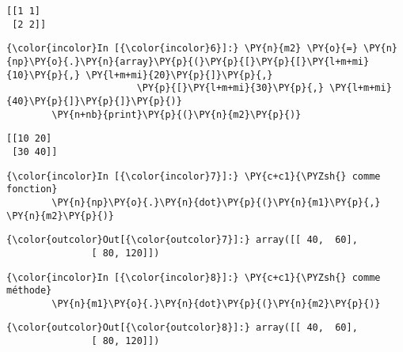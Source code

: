    \begin{Verbatim}[commandchars=\\\{\},frame=single,framerule=0.3mm,rulecolor=\color{cellframecolor}]
[[1 1]
 [2 2]]
\end{Verbatim}

    \begin{Verbatim}[commandchars=\\\{\},frame=single,framerule=0.3mm,rulecolor=\color{cellframecolor}]
{\color{incolor}In [{\color{incolor}6}]:} \PY{n}{m2} \PY{o}{=} \PY{n}{np}\PY{o}{.}\PY{n}{array}\PY{p}{(}\PY{p}{[}\PY{p}{[}\PY{l+m+mi}{10}\PY{p}{,} \PY{l+m+mi}{20}\PY{p}{]}\PY{p}{,}
                       \PY{p}{[}\PY{l+m+mi}{30}\PY{p}{,} \PY{l+m+mi}{40}\PY{p}{]}\PY{p}{]}\PY{p}{)}
        \PY{n+nb}{print}\PY{p}{(}\PY{n}{m2}\PY{p}{)}
\end{Verbatim}


    \begin{Verbatim}[commandchars=\\\{\},frame=single,framerule=0.3mm,rulecolor=\color{cellframecolor}]
[[10 20]
 [30 40]]
\end{Verbatim}

    \begin{Verbatim}[commandchars=\\\{\},frame=single,framerule=0.3mm,rulecolor=\color{cellframecolor}]
{\color{incolor}In [{\color{incolor}7}]:} \PY{c+c1}{\PYZsh{} comme fonction}
        \PY{n}{np}\PY{o}{.}\PY{n}{dot}\PY{p}{(}\PY{n}{m1}\PY{p}{,} \PY{n}{m2}\PY{p}{)}
\end{Verbatim}


\begin{Verbatim}[commandchars=\\\{\},frame=single,framerule=0.3mm,rulecolor=\color{cellframecolor}]
{\color{outcolor}Out[{\color{outcolor}7}]:} array([[ 40,  60],
               [ 80, 120]])
\end{Verbatim}
            
    \begin{Verbatim}[commandchars=\\\{\},frame=single,framerule=0.3mm,rulecolor=\color{cellframecolor}]
{\color{incolor}In [{\color{incolor}8}]:} \PY{c+c1}{\PYZsh{} comme méthode}
        \PY{n}{m1}\PY{o}{.}\PY{n}{dot}\PY{p}{(}\PY{n}{m2}\PY{p}{)}
\end{Verbatim}


\begin{Verbatim}[commandchars=\\\{\},frame=single,framerule=0.3mm,rulecolor=\color{cellframecolor}]
{\color{outcolor}Out[{\color{outcolor}8}]:} array([[ 40,  60],
               [ 80, 120]])
\end{Verbatim}
            
